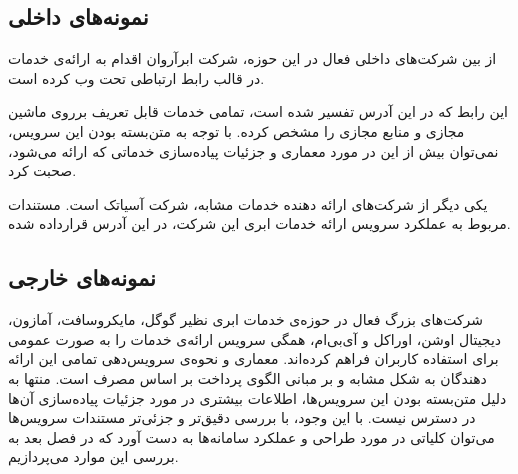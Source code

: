 \subsection{نمونه‌های داخلی}
از بین شرکت‌های داخلی فعال در این حوزه، شرکت ابرآروان اقدام به ارائه‌ی خدمات  در قالب رابط ارتباطی تحت وب کرده است.

این رابط که در این آدرس\cite{arvancloud} تفسیر شده است، تمامی خدمات قابل تعریف برروی ماشین مجازی و منابع مجازی را مشخص کرده. با توجه به متن‌بسته بودن این سرویس، نمی‌توان بیش از این در مورد معماری و جزئیات پیاده‌سازی خدماتی که ارائه می‌شود، صحبت کرد.


یکی دیگر از شرکت‌های ارائه دهنده خدمات مشابه، شرکت آسیاتک است. مستندات مربوط به عملکرد سرویس ارائه خدمات ابری این شرکت، در این آدرس\cite{asiatech} قرارداده شده.


\subsection{نمونه‌های خارجی}
شرکت‌های بزرگ فعال در حوزه‌ی خدمات ابری نظیر گوگل، مایکروسافت، آمازون، دیجیتال اوشن، اوراکل و آی‌بی‌ام، همگی سرویس ارائه‌ی خدمات  را به صورت عمومی برای استفاده کاربران فراهم کرده‌اند. معماری و نحوه‌ی سرویس‌دهی تمامی این ارائه دهندگان به شکل مشابه و بر مبانی الگوی پرداخت بر اساس مصرف است. منتها به دلیل متن‌بسته بودن این سرویس‌ها، اطلاعات بیشتری در مورد جزئیات پیاده‌سازی آن‌ها در دسترس نیست. با این وجود، با بررسی دقیق‌تر و جزئی‌تر مستندات سرویس‌ها می‌توان کلیاتی در مورد طراحی و عملکرد سامانه‌ها به دست آورد که در فصل بعد به بررسی این موارد می‌پردازیم.